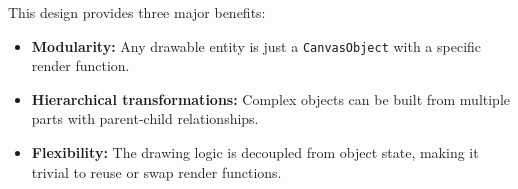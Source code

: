 This design provides three major benefits:
\begin{itemize}
    \item \textbf{Modularity:} Any drawable entity is just a {\footnotesize\texttt{CanvasObject}} with a specific render function.
    \item \textbf{Hierarchical transformations:} Complex objects can be built from multiple parts with parent-child relationships.
    \item \textbf{Flexibility:} The drawing logic is decoupled from object state, making it trivial to reuse or swap render functions.
\end{itemize}
